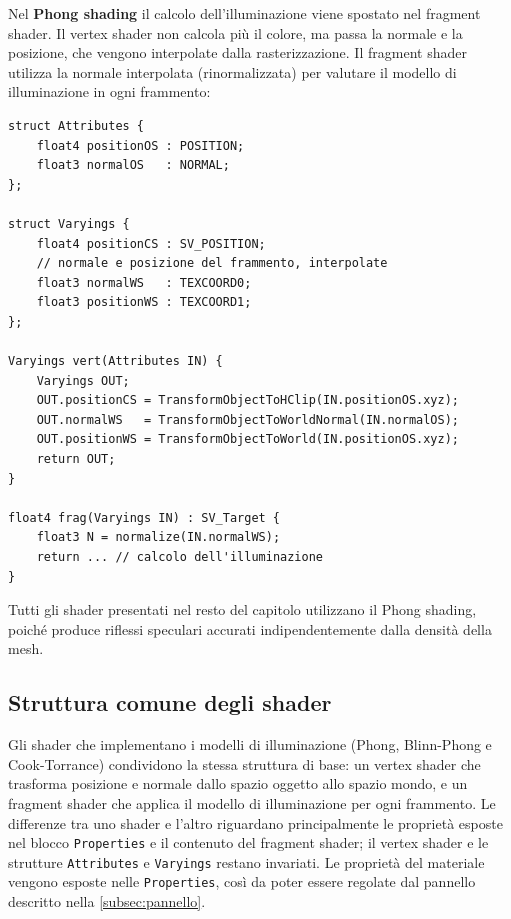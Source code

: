 \documentclass[12pt,a4paper,twoside]{book}
\begin{document}
\begin{minipage}{\textwidth}

Nel \textbf{Phong shading} il calcolo dell'illuminazione viene spostato nel fragment shader. Il vertex shader non calcola più il colore, ma passa la normale e la posizione, che vengono interpolate dalla rasterizzazione. Il fragment shader utilizza la normale interpolata (rinormalizzata) per valutare il modello di illuminazione in ogni frammento:

\begin{lstlisting}[style=hlsl,
    caption={Implementazione del Phong shading.},
    label={lst:phong-shading-impl}]
struct Attributes {
    float4 positionOS : POSITION;
    float3 normalOS   : NORMAL;
};

struct Varyings {
    float4 positionCS : SV_POSITION;
    // normale e posizione del frammento, interpolate
    float3 normalWS   : TEXCOORD0;
    float3 positionWS : TEXCOORD1;
};

Varyings vert(Attributes IN) {
    Varyings OUT;
    OUT.positionCS = TransformObjectToHClip(IN.positionOS.xyz);
    OUT.normalWS   = TransformObjectToWorldNormal(IN.normalOS);
    OUT.positionWS = TransformObjectToWorld(IN.positionOS.xyz);
    return OUT;
}

float4 frag(Varyings IN) : SV_Target {
    float3 N = normalize(IN.normalWS);
    return ... // calcolo dell'illuminazione
}
\end{lstlisting}
\end{minipage}

Tutti gli shader presentati nel resto del capitolo utilizzano il Phong shading, poiché produce riflessi speculari accurati indipendentemente dalla densità della mesh.

\newpage

\subsection{Struttura comune degli shader}
\label{subsec:struttura-comune}

Gli shader che implementano i modelli di illuminazione (Phong, Blinn-Phong e Cook-Torrance) condividono la stessa struttura di base: un vertex shader che trasforma posizione e normale dallo spazio oggetto allo spazio mondo, e un fragment shader che applica il modello di illuminazione per ogni frammento. Le differenze tra uno shader e l'altro riguardano principalmente le proprietà esposte nel blocco \texttt{Properties} e il contenuto del fragment shader; il vertex shader e le strutture \texttt{Attributes} e \texttt{Varyings} restano invariati. Le proprietà del materiale vengono esposte nelle \texttt{Properties}, così da poter essere regolate dal pannello descritto nella \cref{subsec:pannello}.
\end{document}
